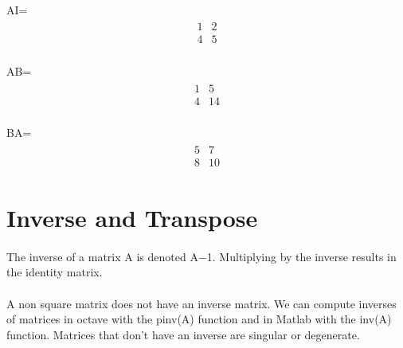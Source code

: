\documentclass{article}
\begin{document}
\begin{CJK}{UTF8}{gbsn}
\paragraph{}
\hspace*{4cm}
AI=
\begin{eqnarray*}
\begin{array}{cc}
1&2\\
4&5
\end{array}
\end{eqnarray*}
\paragraph{}
\hspace*{4cm}
AB=
\begin{eqnarray*}
\begin{array}{cc}
1&5\\
4&14
\end{array}
\end{eqnarray*}
\paragraph{}
\hspace*{4cm}
BA=
\begin{eqnarray*}
\begin{array}{cc}
5&7\\
8&10
\end{array}
\end{eqnarray*}
\section{Inverse and Transpose}
\paragraph{}
The inverse of a matrix A is denoted A−1. Multiplying by the inverse results in the identity matrix.
\paragraph{}
A non square matrix does not have an inverse matrix. We can compute inverses of matrices in octave with the pinv(A) function and in Matlab with the inv(A) function. Matrices that don't have an inverse are singular or degenerate.

\end{CJK}
\end{document}
